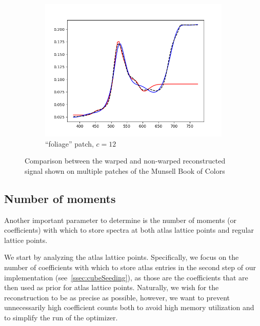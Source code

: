 \begin{figure}[t]
\begin{subfigure}[t]{0.45\textwidth}
		\includegraphics[width=\linewidth]{img/results_techniqueFoliage.png}
		\caption{``foliage'' patch, $c = 12$}
		\label{fig:resultsWarping_foliage}
	\end{subfigure}
	\caption{Comparison between the warped and non-warped reconstructed signal shown on multiple patches of the Munsell Book of Colors}
	\label{fig:resultsWarping}
\end{figure}

\subsection{Number of moments} \label{ssec:noOfMoments}

Another important parameter to determine is the number of moments (or coefficients) with which to store spectra at both atlas lattice points and regular lattice points.

We start by analyzing the atlas lattice points. Specifically, we focus on the number of coefficients with which to store atlas entries in the second step of our implementation (see~\cref{ssec:cubeSeeding}), as those are the coefficients that are then used as prior for atlas lattice points. Naturally, we wish for the reconstruction to be as precise as possible, however, we want to prevent unnecessarily high coefficient counts both to avoid high memory utilization and to simplify the run of the optimizer.

